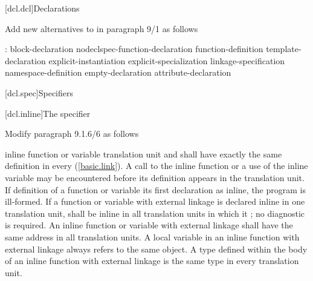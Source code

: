 \setcounter{chapter}{8}
[dcl.dcl]{Declarations}%


\noindent
Add new alternatives to  in paragraph 9/1 as follows
\begin{std.txt}
  \begin{bnf}
    :\br
      block-declaration\br
      nodeclspec-function-declaration\br
      function-definition\br
      template-declaration\br
      explicit-instantiation\br
      explicit-specialization\br
      linkage-specification\br
      namespace-definition\br
      empty-declaration\br
      attribute-declaration\br
      \br
  \end{bnf}
  \end{std.txt}


\setcounter{section}{0}
[dcl.spec]{Specifiers}%

\setcounter{subsection}{5}
[dcl.inline]{The  specifier}%

\noindent
Modify paragraph 9.1.6/6 as follows
\begin{std.txt}
  \resetalinea[5]
  \alinea
  inline function or variable
  translation unit
   and  shall have exactly 
  the same definition in every   (\ref{basic.link}).
  \enternote
  A call to the inline function or a use of 
  the inline variable may be encountered before its definition appears 
  in the translation unit.
  \exitnote
  If   definition of a function or variable
  its first declaration as inline,
  the program is ill-formed. If a 
  function or variable with external  linkage is 
  declared inline in one translation 
  unit,
    shall be
    inline
   in all translation units in which it 
  ; 
  no diagnostic is required. An inline function or variable with 
  external  linkage 
  shall have the same address in all translation units.
  \enternote
  A  local variable in an inline function with external 
   linkage always refers to the same object. A type 
  defined within the body 
  of an inline function with external  linkage is the 
  same type in every translation unit.
  \exitnote
\end{std.txt}

